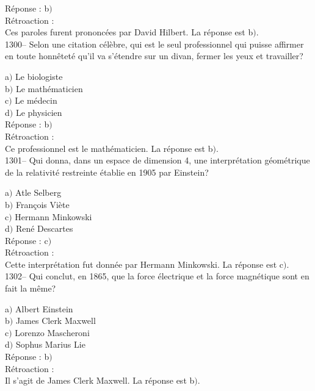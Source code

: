 ﻿\documentclass[letterpaper, 12pt]{article}
\begin{document}
R\'eponse : b$)$\\

R\'etroaction : \\
Ces paroles furent prononc\'ees par David Hilbert.
La r\'eponse est  b$)$.\\

1300-- Selon une citation c\'el\`ebre, qui est le seul professionnel
qui puisse affirmer en toute honn\^etet\'e qu'il va s'\'etendre sur
un divan, fermer les yeux et travailler?

a$)$ Le biologiste \\
b$)$ Le math\'ematicien \\
c$)$ Le m\'edecin \\
d$)$ Le physicien\\

R\'eponse : b$)$\\

R\'etroaction : \\
Ce professionnel est le math\'ematicien.
La r\'eponse est  b$)$.\\

1301-- Qui donna, dans un espace de dimension 4, une
interpr\'etation g\'eom\'etrique de la relativit\'e restreinte
\'etablie en 1905 par Einstein?

a$)$ Atle Selberg \\
b$)$ Fran\c cois Vi\`ete \\
c$)$ Hermann Minkowski \\
d$)$ Ren\'e Descartes\\

R\'eponse : c$)$\\

R\'etroaction : \\
Cette interpr\'etation fut donn\'ee par Hermann Minkowski.
La r\'eponse est  c$)$.\\

1302-- Qui conclut, en 1865, que la force \'electrique et la force
magn\'etique sont en fait la m\^eme?

a$)$ Albert Einstein \\
b$)$ James Clerk Maxwell \\
c$)$ Lorenzo Mascheroni\\
d$)$ Sophus Marius Lie\\

R\'eponse : b$)$\\

R\'etroaction : \\
Il s'agit de James Clerk Maxwell.
La r\'eponse est  b$)$.\\
\end{document}
